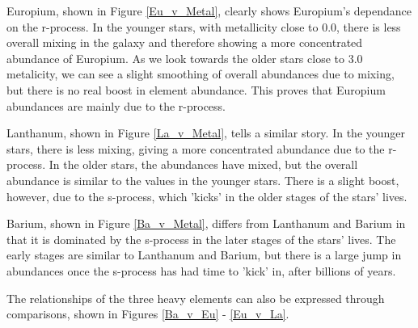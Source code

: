 Europium, shown in Figure \ref{Eu_v_Metal}, clearly shows Europium's dependance on the r-process. In the younger stars, with metallicity close to 0.0, there is less overall mixing in the galaxy and therefore showing a more concentrated abundance of Europium. As we look towards the older stars close to 3.0 metalicity, we can see a slight smoothing of overall abundances due to mixing, but there is no real boost in element abundance. This proves that Europium abundances are mainly due to the r-process.

Lanthanum, shown in Figure \ref{La_v_Metal}, tells a similar story. In the younger stars, there is less mixing, giving a more concentrated abundance due to the r-process. In the older stars, the abundances have mixed, but the overall abundance is similar to the values in the younger stars. There is a slight boost, however, due to the s-process, which 'kicks' in the older stages of the stars' lives. 

Barium, shown in Figure \ref{Ba_v_Metal}, differs from Lanthanum and Barium in that it is dominated by the s-process in the later stages of the stars' lives. The early stages are similar to Lanthanum and Barium, but there is a large jump in abundances once the s-process has had time to 'kick' in, after billions of years.

The relationships of the three heavy elements can also be expressed through comparisons, shown in Figures \ref{Ba_v_Eu} - \ref{Eu_v_La}.

